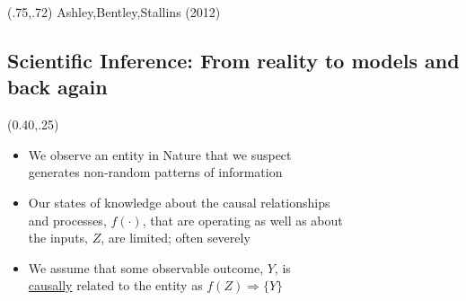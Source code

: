 \documentclass[
paper=128mm:96mm, %
fontsize=11pt, %
pagesize, %
parskip=half-, %
]{scrartcl}
\theoremstyle{mythmstyle} %
\begin{document}
 
\begin{textblock}{1}(.75,.72)
  \tiny {Ashley,Bentley,Stallins (2012)}
\end{textblock}
 
\clearpage



\subsection{Scientific Inference: From reality to models and back again}

 
 
 \begin{textblock}{1}(0.40,.25)
  \scriptsize {
  \begin{itemize}
  	\item We observe an entity in Nature that we suspect \\
  	generates non-random patterns of information
  	\item Our states of knowledge about the causal relationships \\
  	and processes, $f(\cdot )$, that are operating as well as about \\
  	the inputs,	$Z$, are limited; often severely	
  	\item We assume that some observable outcome, $Y$, is \\
  	\underline{causally} related to the entity as $f(Z) \Longrightarrow \{Y\}$  	
  \end{itemize}
  }
 \end{textblock}
 
\end{document}

